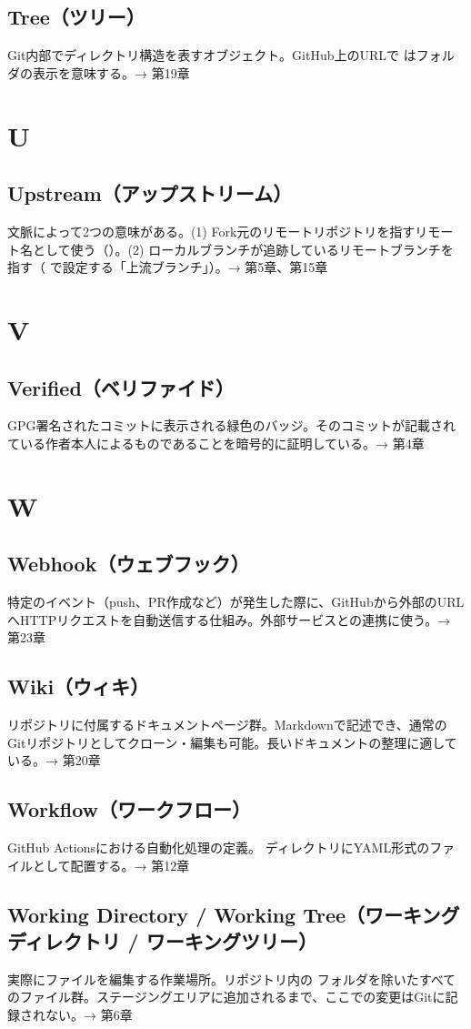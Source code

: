 \subsection*{Tree（ツリー）}
Git内部でディレクトリ構造を表すオブジェクト。GitHub上のURLで  はフォルダの表示を意味する。→ 第19章

\section*{U}

\subsection*{Upstream（アップストリーム）}
文脈によって2つの意味がある。(1) Fork元のリモートリポジトリを指すリモート名として使う（）。(2) ローカルブランチが追跡しているリモートブランチを指す（ で設定する「上流ブランチ」）。→ 第5章、第15章

\section*{V}

\subsection*{Verified（ベリファイド）}
GPG署名されたコミットに表示される緑色のバッジ。そのコミットが記載されている作者本人によるものであることを暗号的に証明している。→ 第4章

\section*{W}

\subsection*{Webhook（ウェブフック）}
特定のイベント（push、PR作成など）が発生した際に、GitHubから外部のURLへHTTPリクエストを自動送信する仕組み。外部サービスとの連携に使う。→ 第23章

\subsection*{Wiki（ウィキ）}
リポジトリに付属するドキュメントページ群。Markdownで記述でき、通常のGitリポジトリとしてクローン・編集も可能。長いドキュメントの整理に適している。→ 第20章

\subsection*{Workflow（ワークフロー）}
GitHub Actionsにおける自動化処理の定義。 ディレクトリにYAML形式のファイルとして配置する。→ 第12章

\subsection*{Working Directory / Working Tree（ワーキングディレクトリ / ワーキングツリー）}
実際にファイルを編集する作業場所。リポジトリ内の  フォルダを除いたすべてのファイル群。ステージングエリアに追加されるまで、ここでの変更はGitに記録されない。→ 第6章
